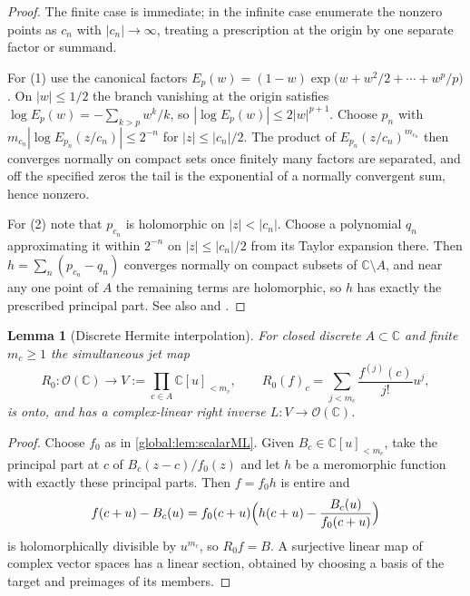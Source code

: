\documentclass[11pt,letterpaper]{article}
\newtheorem{lemma}[lemma]{Lemma}
\theoremstyle{definition}
\theoremstyle{remark}
\newcommand{\C}{\mathbb C}
\newcommand{\OO}{\mathcal O}
\newcommand{\abs}[1]{\left|#1\right|}
\numberwithin{equation}{section}
\begin{document}
\begin{proof}
The finite case is immediate; in the infinite case enumerate the nonzero points as $c_n$ with $\abs{c_n}\to\infty$, treating a prescription at the origin by one separate factor or summand.

For (1) use the canonical factors $E_p(w)=(1-w)\exp\bigl(w+w^2/2+\cdots+w^p/p\bigr)$. On $\abs w\le1/2$ the branch vanishing at the origin satisfies $\log E_p(w)=-\sum_{k>p}w^k/k$, so $\abs{\log E_p(w)}\le2\abs w^{p+1}$. Choose $p_n$ with $m_{c_n}\abs{\log E_{p_n}(z/c_n)}\le2^{-n}$ for $\abs z\le\abs{c_n}/2$. The product of $E_{p_n}(z/c_n)^{m_{c_n}}$ then converges normally on compact sets once finitely many factors are separated, and off the specified zeros the tail is the exponential of a normally convergent sum, hence nonzero.

For (2) note that $p_{c_n}$ is holomorphic on $\abs z<\abs{c_n}$. Choose a polynomial $q_n$ approximating it within $2^{-n}$ on $\abs z\le\abs{c_n}/2$ from its Taylor expansion there. Then $h=\sum_n(p_{c_n}-q_n)$ converges normally on compact subsets of $\C\setminus A$, and near any one point of $A$ the remaining terms are holomorphic, so $h$ has exactly the prescribed principal part. See also \cite[Theorem~3.26]{McMullen} and \cite{Ahlfors}.
\end{proof}

\begin{lemma}[Discrete Hermite interpolation]\label{global:lem:hermite}
For closed discrete $A\subset\C$ and finite $m_c\ge1$ the simultaneous jet map
\begin{equation}\label{global:eq:scalarjets}
  R_0:\OO(\C)\longrightarrow V:=\prod_{c\in A}\C[u]_{<m_c},
  \qquad
  R_0(f)_c=\sum_{j<m_c}\frac{f^{(j)}(c)}{j!}u^j,
\end{equation}
is onto, and has a complex-linear right inverse $L:V\to\OO(\C)$.
\end{lemma}

\begin{proof}
Choose $f_0$ as in \cref{global:lem:scalarML}. Given $B_c\in\C[u]_{<m_c}$, take the principal part at $c$ of $B_c(z-c)/f_0(z)$ and let $h$ be a meromorphic function with exactly these principal parts. Then $f=f_0h$ is entire and
\[
  f(c+u)-B_c(u)
  =f_0(c+u)\Bigl(h(c+u)-\frac{B_c(u)}{f_0(c+u)}\Bigr)
\]
is holomorphically divisible by $u^{m_c}$, so $R_0f=B$. A surjective linear map of complex vector spaces has a linear section, obtained by choosing a basis of the target and preimages of its members.
\end{proof}
\end{document}
